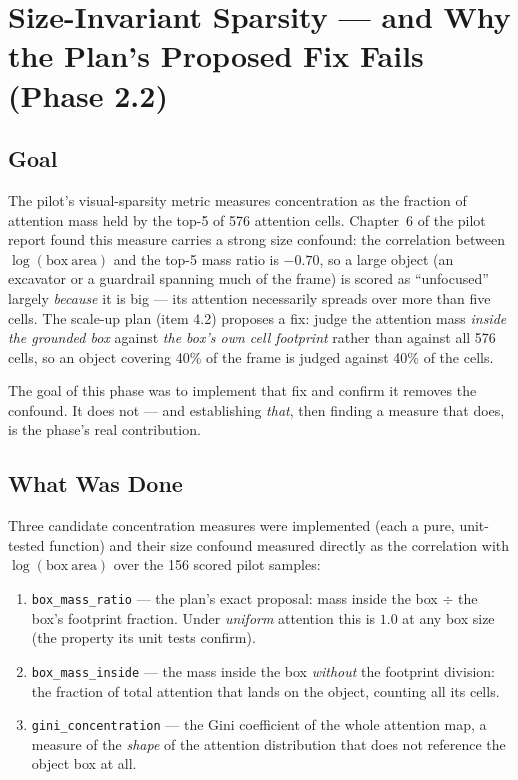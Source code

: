 \chapter{Size-Invariant Sparsity --- and Why the Plan's Proposed Fix Fails (Phase 2.2)}
\label{chap:p2-2}

\section{Goal}

The pilot's visual-sparsity metric measures concentration as the fraction of attention mass held by the
top-5 of 576 attention cells. Chapter~6 of the pilot report found this measure carries a strong size
confound: the correlation between $\log(\mathrm{box\ area})$ and the top-5 mass ratio is $-0.70$, so a
large object (an excavator or a guardrail spanning much of the frame) is scored as ``unfocused''
largely \emph{because} it is big --- its attention necessarily spreads over more than five cells. The
scale-up plan (item 4.2) proposes a fix: judge the attention mass \emph{inside the grounded box}
against \emph{the box's own cell footprint} rather than against all 576 cells, so an object covering
40\% of the frame is judged against 40\% of the cells.

The goal of this phase was to implement that fix and confirm it removes the confound. It does not ---
and establishing \emph{that}, then finding a measure that does, is the phase's real contribution.

\section{What Was Done}

Three candidate concentration measures were implemented (each a pure, unit-tested function) and their
size confound measured directly as the correlation with $\log(\mathrm{box\ area})$ over the 156 scored
pilot samples:

\begin{enumerate}
  \item \texttt{box\_mass\_ratio} --- the plan's exact proposal: mass inside the box $\div$ the box's
  footprint fraction. Under \emph{uniform} attention this is $1.0$ at any box size (the property its
  unit tests confirm).
  \item \texttt{box\_mass\_inside} --- the mass inside the box \emph{without} the footprint division:
  the fraction of total attention that lands on the object, counting all its cells.
  \item \texttt{gini\_concentration} --- the Gini coefficient of the whole attention map, a measure of
  the \emph{shape} of the attention distribution that does not reference the object box at all.
\end{enumerate}

